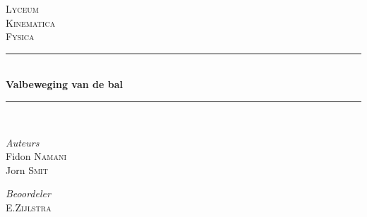 \begin{titlepage} 
	\newcommand{\HRule}{\rule{\linewidth}{0.5mm}} %
	
	\center%
	
	
	\textsc{\LARGE Lyceum}\\[1.5cm] %
	
	\textsc{\Large Kinematica}\\[0.5cm] %
	
	\textsc{\large Fysica}\\[0.5cm] %
	
	
	\HRule\\[0.4cm] %
	
	{\huge\bfseries Valbeweging van de bal}\\[0.4cm] %
	
	\HRule\\[1.5cm]
	
	
	\begin{minipage}{0.4\textwidth}
		\begin{flushleft} %
			\large
			\textit{Auteurs}\\
			Fidon \textsc{Namani}\\
			Jorn \textsc{Smit} %
		\end{flushleft}
	\end{minipage}
	\begin{minipage}{0.4\textwidth}
		\begin{flushright} %
			\large
			\textit{Beoordeler}\\
			E.\textsc{Zijlstra} %
		\end{flushright}
	\end{minipage}



\end{titlepage}
